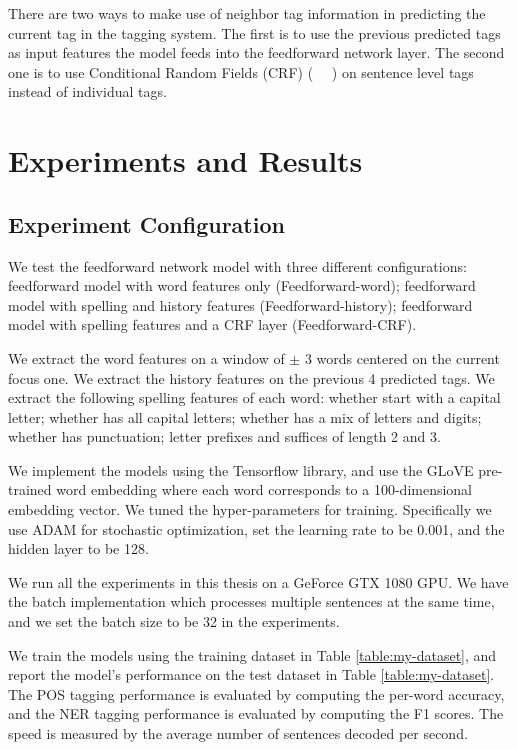 \documentclass{sfuthesis}
\begin{document}
There are two ways to make use of neighbor tag information in predicting the current tag in the tagging system. The first is to use the previous predicted tags as input features the model feeds into the feedforward network layer. The second one is to use Conditional Random Fields (CRF) (~\citeauthor{lafferty2001conditional} ~\citeyear{lafferty2001conditional}) on sentence level tags instead of individual tags.

\section{Experiments and Results}

\subsection{Experiment Configuration}
\label{ff-subsection}
We test the feedforward network model with three different configurations: feedforward model with word features only (Feedforward-word); feedforward model with spelling and history features (Feedforward-history); feedforward model with spelling features and a CRF layer (Feedforward-CRF). 

We extract the word features on a window of $\pm$ 3 words centered on the current focus one. We extract the history features on the previous 4 predicted tags. We extract the following spelling features of each word: whether start with a capital letter; whether has all capital letters; whether has a mix of letters and digits; whether has punctuation; letter prefixes and suffices of length 2 and 3.

We implement the models using the Tensorflow library, and use the GLoVE pre-trained word embedding where each word corresponds to a 100-dimensional embedding vector. We tuned the hyper-parameters for training. Specifically we use ADAM for stochastic optimization, set the learning rate to be 0.001, and the hidden layer to be 128. 

We run all the experiments in this thesis on a GeForce GTX 1080 GPU. We have the batch implementation which processes multiple sentences at the same time, and we set the batch size to be 32 in the experiments.

We train the models using the training dataset in Table \ref{table:my-dataset}, and report the model's performance on the test dataset in Table \ref{table:my-dataset}. The POS tagging performance is evaluated by computing the per-word accuracy, and the NER tagging performance is evaluated by computing the F1 scores. The speed is measured by the average number of sentences decoded per second. 
\end{document}
